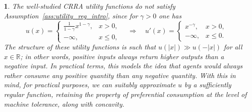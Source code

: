 \documentclass[11pt,oneside,english,reqno,dvipsnames,table]{amsart}
\numberwithin{equation}{section}
\theoremstyle{plain}
\theoremstyle{definition}
\theoremstyle{remark}
\theoremstyle{plain}
\theoremstyle{plain}
\theoremstyle{plain}
\theoremstyle{plain}
\theoremstyle{plain}
\newtheorem{ex}[thm]{\protect\examplename}
\theoremstyle{plain}
\theoremstyle{plain}
\providecommand{\examplename}{Example}
\newcommand{\mbR}{\mathbb{R}}
\numberwithin{thm}{section}
\begin{document}
\begin{ex}\label{ex:quad_crra_approx} 
%
    The well-studied CRRA utility functions do not satisfy Assumption~\ref{ass:utility_reg_intro}, since for $\gamma>0$ one has
    \begin{equation*}
        u(x) = \begin{cases}
            \frac{1}{1-\gamma} x^{1-\gamma}, &x > 0,\\
            -\infty, & x \leq 0,
        \end{cases}\quad\Rightarrow \quad  u'(x) = \begin{cases}
            x^{-\gamma}, & x>0,\\
            -\infty, & x\leq 0.
        \end{cases}
    \end{equation*}
    The structure of these utility functions is such that $u(|x|) \gg u(-|x|)$ for all $x\in \mbR$; in other words, positive inputs always return higher outputs than a negative input. In practical terms, this models the idea that agents would always rather consume any positive quantity than any negative quantity. With this in mind, for practical purposes, we can suitably approximate $u$ by a sufficiently regular function, retaining the property of preferential consumption at the level of machine tolerance, along with concavity.
    

\end{ex}
\end{document}

